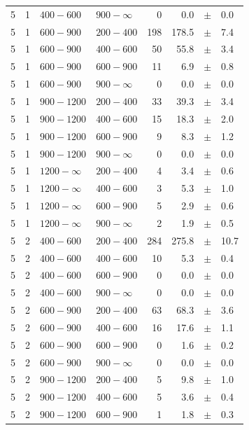 \begin{table}[!t]
\begin{tabular}{rrllrrcl}
5 & 1 & $ 400- 600$ & $900-\infty$ &      0 &      0.0 &$\pm$&    0.0 \\
5 & 1 & $ 600- 900$ & $200-400$ &    198 &    178.5 &$\pm$&    7.4 \\
5 & 1 & $ 600- 900$ & $400-600$ &     50 &     55.8 &$\pm$&    3.4 \\
5 & 1 & $ 600- 900$ & $600-900$ &     11 &      6.9 &$\pm$&    0.8 \\
5 & 1 & $ 600- 900$ & $900-\infty$ &      0 &      0.0 &$\pm$&    0.0 \\
5 & 1 & $ 900-1200$ & $200-400$ &     33 &     39.3 &$\pm$&    3.4 \\
5 & 1 & $ 900-1200$ & $400-600$ &     15 &     18.3 &$\pm$&    2.0 \\
5 & 1 & $ 900-1200$ & $600-900$ &      9 &      8.3 &$\pm$&    1.2 \\
5 & 1 & $ 900-1200$ & $900-\infty$ &      0 &      0.0 &$\pm$&    0.0 \\
5 & 1 & $1200- \infty$ & $200-400$ &      4 &      3.4 &$\pm$&    0.6 \\
5 & 1 & $1200- \infty$ & $400-600$ &      3 &      5.3 &$\pm$&    1.0 \\
5 & 1 & $1200- \infty$ & $600-900$ &      5 &      2.9 &$\pm$&    0.6 \\
5 & 1 & $1200- \infty$ & $900-\infty$ &      2 &      1.9 &$\pm$&    0.5 \\
5 & 2 & $ 400- 600$ & $200-400$ &    284 &    275.8 &$\pm$&   10.7 \\
5 & 2 & $ 400- 600$ & $400-600$ &     10 &      5.3 &$\pm$&    0.4 \\
5 & 2 & $ 400- 600$ & $600-900$ &      0 &      0.0 &$\pm$&    0.0 \\
5 & 2 & $ 400- 600$ & $900-\infty$ &      0 &      0.0 &$\pm$&    0.0 \\
5 & 2 & $ 600- 900$ & $200-400$ &     63 &     68.3 &$\pm$&    3.6 \\
5 & 2 & $ 600- 900$ & $400-600$ &     16 &     17.6 &$\pm$&    1.1 \\
5 & 2 & $ 600- 900$ & $600-900$ &      0 &      1.6 &$\pm$&    0.2 \\
5 & 2 & $ 600- 900$ & $900-\infty$ &      0 &      0.0 &$\pm$&    0.0 \\
5 & 2 & $ 900-1200$ & $200-400$ &      5 &      9.8 &$\pm$&    1.0 \\
5 & 2 & $ 900-1200$ & $400-600$ &      5 &      3.6 &$\pm$&    0.4 \\
5 & 2 & $ 900-1200$ & $600-900$ &      1 &      1.8 &$\pm$&    0.3 \\

\end{tabular}
\end{table}

